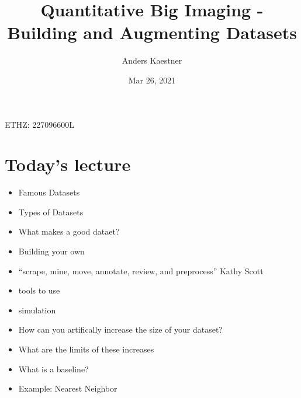 \documentclass[letterpaper,10pt,english]{sphinxmanual}
\title{Quantitative Big Imaging - Building and Augmenting Datasets}
\date{Mar 26, 2021}
\author{Anders Kaestner}
\begin{document}
\pagestyle{empty}
\sphinxmaketitle
\pagestyle{plain}
\sphinxtableofcontents
\pagestyle{normal}
\label{\detokenize{03-Datasets::doc}}


\sphinxAtStartPar
{} ETHZ: 227\sphinxhyphen{}0966\sphinxhyphen{}00L




\chapter{Today’s lecture}
\label{\detokenize{03-Datasets:today-s-lecture}}
\sphinxAtStartPar
{}
\begin{itemize}
\item {} 
\sphinxAtStartPar
Famous Datasets

\item {} 
\sphinxAtStartPar
Types of Datasets

\item {} 
\sphinxAtStartPar
What makes a good dataet?

\item {} 
\sphinxAtStartPar
Building your own

\item {} 
\sphinxAtStartPar
“scrape, mine, move, annotate, review, and preprocess” \sphinxhyphen{} Kathy Scott

\item {} 
\sphinxAtStartPar
tools to use

\item {} 
\sphinxAtStartPar
simulation

\end{itemize}

\sphinxAtStartPar
{}
\begin{itemize}
\item {} 
\sphinxAtStartPar
How can you artifically increase the size of your dataset?

\item {} 
\sphinxAtStartPar
What are the limits of these increases

\end{itemize}

\sphinxAtStartPar
{}
\begin{itemize}
\item {} 
\sphinxAtStartPar
What is a baseline?

\item {} 
\sphinxAtStartPar
Example: Nearest Neighbor

\end{itemize}
\end{document}
